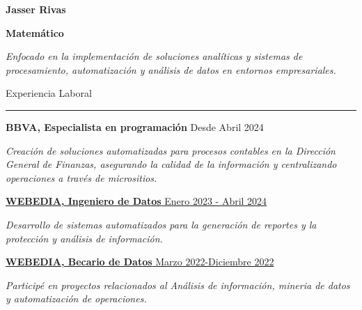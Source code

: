 \documentclass{article}
\begin{document}
\hfill
\begin{minipage}[t]{0.60\textwidth}
\setlength{\baselineskip}{1.5\baselineskip}
\vspace{0.5cm}
{\huge \textbf{Jasser Rivas}}

{\large \textbf{Matemático}}

 
{\small \textit{Enfocado en la implementación de soluciones analíticas y
sistemas de procesamiento, automatización y análisis de datos en entornos empresariales.}}

\vspace{0.5cm}

{\large Experiencia Laboral}
\rule{\linewidth}{0.4pt}


\vspace{0.2cm}

{\large \textbf{BBVA, Especialista en programación}}
{\small Desde Abril 2024}

{\small \textit{Creación de soluciones automatizadas para procesos contables en la Dirección General de Finanzas, asegurando la calidad de la información y centralizando operaciones a través de 
micrositios.}}


\hypersetup{
    urlcolor=black,
    linkcolor=blue
}

\href{https://latam.webedia-group.com/nuestras-marcas-y-comunidades/}{{\large \textbf{WEBEDIA, Ingeniero de Datos}}
{\small Enero 2023 - Abril 2024}}

{\small \textit{Desarrollo de sistemas automatizados para la generación de reportes y la protección y análisis de información.}}


\href{https://latam.webedia-group.com/nuestras-marcas-y-comunidades/}{{\large \textbf{WEBEDIA, Becario de Datos}}
{\small Marzo 2022-Diciembre 2022}}


{\small \textit{Participé en proyectos relacionados al Análisis de información, mineria de datos y automatización de operaciones.}}




\end{minipage}
\end{document}

